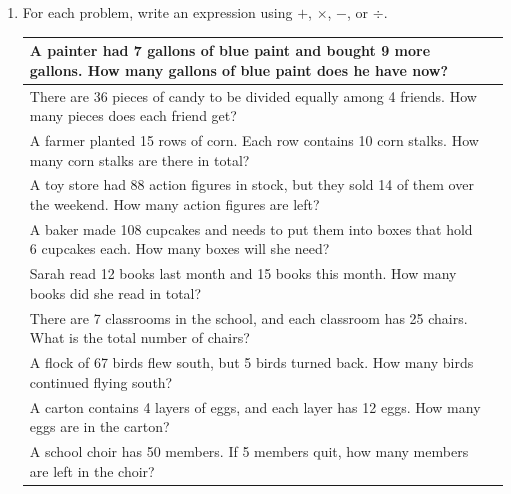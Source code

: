 \documentclass{tufte-book}
\providecommand{\tabularnewline}{\\}
\begin{document}
\begin{enumerate}
\item For each problem, write an expression using $+$, $\times$, $-$, or $\div$.\par\bigskip
\begin{fullwidth}
  \begin{tabular}{>{}p{}>{\centering}b{}}
  \toprule
  {A painter had 7 gallons of blue paint and bought 9 more gallons. How many gallons of blue paint does he have now?} & \tabularnewline
  \midrule
  {There are 36 pieces of candy to be divided equally among 4 friends. How many pieces does each friend get?} & \tabularnewline
  \midrule
  {A farmer planted 15 rows of corn. Each row contains 10 corn stalks. How many corn stalks are there in total?} & \tabularnewline
  \midrule
  {A toy store had 88 action figures in stock, but they sold 14 of them over the weekend. How many action figures are left?} & \tabularnewline
  \midrule
  {A baker made 108 cupcakes and needs to put them into boxes that hold 6 cupcakes each. How many boxes will she need?} & \tabularnewline
  \midrule
  {Sarah read 12 books last month and 15 books this month. How many books did she read in total?} & \tabularnewline
  \midrule
  {There are 7 classrooms in the school, and each classroom has 25 chairs. What is the total number of chairs?} & \tabularnewline
  \midrule
  {A flock of 67 birds flew south, but 5 birds turned back. How many birds continued flying south?} & \tabularnewline
  \midrule
  {A carton contains 4 layers of eggs, and each layer has 12 eggs. How many eggs are in the carton?} & \tabularnewline
  \midrule
  {A school choir has 50 members. If 5 members quit, how many members are left in the choir?} & \tabularnewline
  \bottomrule
  \end{tabular}
\end{fullwidth}
\end{enumerate}
\end{document}
